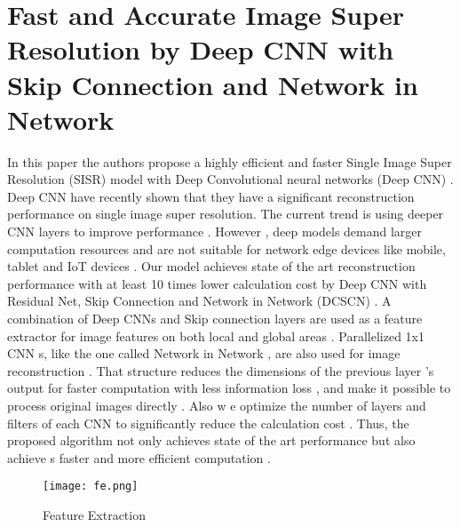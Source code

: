 \section{Fast and Accurate Image Super Resolution by Deep CNN with Skip Connection and Network in Network}
In this paper the authors propose a highly efficient and faster Single Image Super Resolution (SISR) model with Deep Convolutional neural networks (Deep CNN) . Deep CNN have recently shown that they have a significant reconstruction performance on single image super resolution. The current trend is using deeper CNN layers to improve performance . However , deep models demand larger computation resources and are not suitable for network edge devices like mobile, tablet and IoT devices . Our model achieves state of the art reconstruction performance with at least 10 times lower calculation cost by Deep CNN with Residual Net, Skip Connection and Network in Network (DCSCN) . A combination of Deep CNNs and Skip connection layers are used as a feature extractor for image features on both local and global areas . Parallelized 1x1 CNN s, like the one called Network in Network , are also used for image reconstruction . That structure reduces the dimensions of the previous layer ’s output for faster computation with less information loss , and make it possible to process original images directly . Also w e optimize the number of layers and filters of each CNN to significantly reduce the calculation cost . Thus, the proposed algorithm not only achieves state of the art performance but also achieve s faster and more efficient computation .

\begin{figure}[htb]
    \centering
    \texttt{[image: fe.png]}
    \caption{Feature Extraction}
    \label{fig:fe} %
\end{figure}

